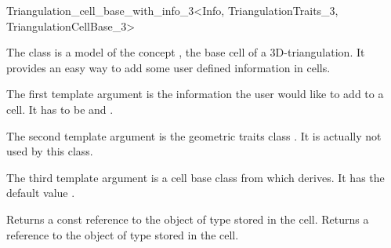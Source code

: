 

\begin{ccRefClass}{Triangulation_cell_base_with_info_3<Info, TriangulationTraits_3, TriangulationCellBase_3>}

\ccDefinition

The class  is a model of the concept
, the base cell of a 3D-triangulation.
It provides an easy way to add some user defined information in cells.


\ccParameters

The first template argument is the information the user would like to add
to a cell.  It has to be  and .

The second template argument is the geometric traits class
.  It is actually not used by this class.

The third template argument is a cell base class from which
 derives.  It has the default value
.

\ccIsModel {}

\ccInheritsFrom {}

\ccTypes
{}


\ccAccessFunctions
{}
\ccTagFullDeclarations

{Returns a const reference to the object of type  stored in the cell.}
\ccGlue
{}
{Returns a reference to the object of type  stored in the cell.}

\ccSeeAlso

\\

\end{ccRefClass}
